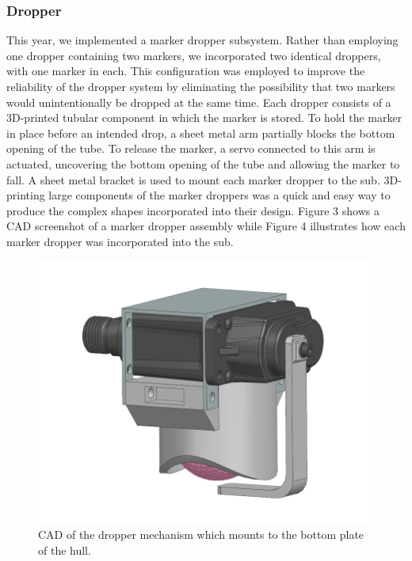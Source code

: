 \documentclass[conference]{IEEEtran}
\begin{document}
\subsubsection{Dropper}
\label{sssec:dropper}

This year, we implemented a marker dropper subsystem. Rather than employing one dropper containing two markers, we incorporated two identical droppers, with one marker in each. This configuration was employed to improve the reliability of the dropper system by eliminating the possibility that two markers would unintentionally be dropped at the same time.
Each dropper consists of a 3D-printed tubular component in which the marker is stored. To hold the marker in place before an intended drop, a sheet metal arm partially blocks the bottom opening of the tube. To release the marker, a servo connected to this arm is actuated, uncovering the bottom opening of the tube and allowing the marker to fall. A sheet metal bracket is used to mount each marker dropper to the sub. 3D-printing large components of the marker droppers was a quick and easy way to produce the complex shapes incorporated into their design. Figure 3 shows a CAD screenshot of a marker dropper assembly while Figure 4 illustrates how each marker dropper was incorporated into the sub.

\begin{figure}[h]
    \centerline{\includegraphics[scale=0.5]{images/Dropper.PNG}}
    \caption{CAD of the dropper mechanism which mounts to the bottom plate of the hull.}
    \label{fig:sub3}
\end{figure}
\end{document}
